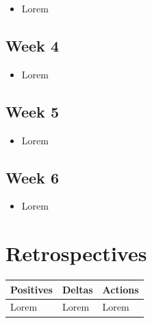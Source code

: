 \documentclass[10pt, onecolumn, draftclsnofoot, letterpaper, compsoc]{IEEEtran}
\begin{document}
    \begin{itemize}

	\item Lorem

    \end{itemize}

\subsection{Week 4}

    \begin{itemize}

	\item Lorem

    \end{itemize}

\subsection{Week 5}

    \begin{itemize}

	\item Lorem

    \end{itemize}

\subsection{Week 6}

    \begin{itemize}

	\item Lorem

    \end{itemize}

\newpage
\section{Retrospectives}

\begin{table}[!h]
    \centering
    \begin{tabular}{|p{.3\linewidth}|p{.3\linewidth}|p{.3\linewidth}|}

    \cline{3-3}

    \hline \textbf{Positives} & \textbf{Deltas} & \textbf{Actions} \\ \hline

    Lorem & Lorem & Lorem \\ \hline

    \end{tabular}
\end{table}
\end{document}
